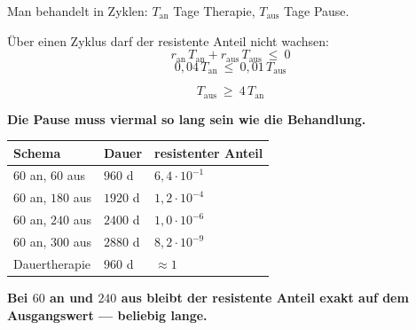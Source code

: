 \begin{merksatz}
Man behandelt in Zyklen: $T_{\text{an}}$ Tage Therapie, $T_{\text{aus}}$ Tage Pause.

Über einen Zyklus darf der resistente Anteil nicht wachsen:
\[ r_{\text{an}}\,T_{\text{an}} + r_{\text{aus}}\,T_{\text{aus}} \ \le\ 0 \]
\[ 0{,}04\,T_{\text{an}} \ \le\ 0{,}01\,T_{\text{aus}} \]

\[ \boxed{\ T_{\text{aus}} \ \ge\ 4\,T_{\text{an}}\ } \]

\begin{center}
\begin{minipage}{0.9\textwidth}
\textbf{Die Pause muss viermal so lang sein wie die Behandlung.}
\end{minipage}
\end{center}

\begin{center}
{\small
\renewcommand{\arraystretch}{1.48}
\begin{tabular}{@{}P{2.4cm}P{2.2cm}P{2.8cm}@{}}
\toprule
\textbf{Schema} & \textbf{Dauer} & \textbf{resistenter Anteil}\\
\midrule
$60$ an, $60$ aus & $960$ d & $6{,}4\cdot10^{-1}$\\
$60$ an, $180$ aus & $1920$ d & $1{,}2\cdot10^{-4}$\\
$60$ an, $240$ aus & $2400$ d & $1{,}0\cdot10^{-6}$\\
$60$ an, $300$ aus & $2880$ d & $8{,}2\cdot10^{-9}$\\
\midrule
Dauertherapie & $960$ d & $\approx 1$\\
\bottomrule
\end{tabular}}
\end{center}

\begin{center}
\begin{minipage}{0.9\textwidth}
\textbf{Bei $60$ an und $240$ aus bleibt der resistente Anteil exakt auf dem Ausgangswert --- beliebig lange.}
\end{minipage}
\end{center}

\begin{center}
\begin{minipage}{0.88\textwidth}
\end{minipage}
\end{center}


\end{merksatz}
